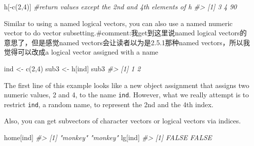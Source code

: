 \documentclass[
]{book}
\newenvironment{Shaded}{\begin{snugshade}}{\end{snugshade}}
\newcommand{\CommentTok}[1]{\textcolor[rgb]{0.56,0.35,0.01}{\textit{#1}}}
\newcommand{\DecValTok}[1]{\textcolor[rgb]{0.00,0.00,0.81}{#1}}
\newcommand{\FunctionTok}[1]{\textcolor[rgb]{0.00,0.00,0.00}{#1}}
\newcommand{\NormalTok}[1]{#1}
\newcommand{\OtherTok}[1]{\textcolor[rgb]{0.56,0.35,0.01}{#1}}
\newcommand{\SpecialCharTok}[1]{\textcolor[rgb]{0.00,0.00,0.00}{#1}}
\begin{document}
\begin{Shaded}
\begin{Highlighting}[]
\NormalTok{h[}\SpecialCharTok{{-}}\FunctionTok{c}\NormalTok{(}\DecValTok{2}\NormalTok{,}\DecValTok{4}\NormalTok{)]  }\CommentTok{\#return values except the 2nd and 4th elements of h}
\CommentTok{\#\textgreater{} [1]  3  4 90}
\end{Highlighting}
\end{Shaded}

Similar to using a named logical vectors, you can also use a named numeric vector to do vector subsetting.\#comment:我get到这里说named logical vectors的意思了，但是感觉named vectors会让读者以为是2.5.1那种named vectors，所以我觉得可以改成a logical vector assigned with a name

\begin{Shaded}
\begin{Highlighting}[]
\NormalTok{ind }\OtherTok{\textless{}{-}} \FunctionTok{c}\NormalTok{(}\DecValTok{2}\NormalTok{,}\DecValTok{4}\NormalTok{)}
\NormalTok{sub3 }\OtherTok{\textless{}{-}}\NormalTok{ h[ind]}
\NormalTok{sub3}
\CommentTok{\#\textgreater{} [1] 1 2}
\end{Highlighting}
\end{Shaded}

The first line of this example looks like a new object assignment that assigns two numeric values, 2 and 4, to the name \texttt{ind}. However, what we really attempt is to restrict \texttt{ind}, a random name, to represent the 2nd and the 4th index.

Also, you can get subvectors of character vectors or logical vectors via indices.

\begin{Shaded}
\begin{Highlighting}[]
\NormalTok{home[ind]}
\CommentTok{\#\textgreater{} [1] "monkey" "monkey"}
\NormalTok{lg[ind]}
\CommentTok{\#\textgreater{} [1] FALSE FALSE}
\end{Highlighting}
\end{Shaded}
\end{document}

